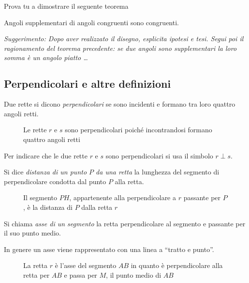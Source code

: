 Prova tu a dimostrare il seguente teorema

\begin{teorema}
Angoli supplementari di angoli congruenti sono congruenti.
\end{teorema}

\emph{Suggerimento: Dopo aver realizzato il disegno, esplicita ipotesi e tesi. Segui poi il ragionamento del teorema precedente: se due angoli sono supplementari la loro somma è un angolo piatto \ldots{}}

\subsection{Perpendicolari e altre definizioni}

\begin{definizione}
Due rette si dicono \emph{perpendicolari} se sono incidenti e formano tra loro quattro angoli retti.
\end{definizione}

\begin{figure}[htb]
\centering
\caption{Le rette $r$ e $s$ sono perpendicolari poiché incontrandosi formano quattro angoli retti}
\end{figure}

Per indicare che le due rette $r$ e $s$ sono perpendicolari si usa il simbolo $r\perp s$.

\begin{definizione}
Si dice \emph{distanza di un punto $P$ da una retta} la lunghezza del segmento di perpendicolare condotta dal punto $P$ alla retta.
\end{definizione}

\begin{figure}[htb]
\centering
\caption{Il segmento $PH$, appartenente alla perpendicolare a $r$ passante per $P$, è la distanza di $P$ dalla retta $r$}
\end{figure}

\begin{definizione}
Si chiama \emph{asse di un segmento} la retta perpendicolare al segmento e passante per il suo punto medio.
\end{definizione}

In genere un asse viene rappresentato con una linea a ``tratto e punto''.

\begin{figure}[htb]
\centering
\caption{La retta $r$ è l'asse del segmento $AB$ in quanto è perpendicolare alla retta per $AB$ e passa per $M$, il punto medio di $AB$}\label{fig:1.38}
\end{figure}


